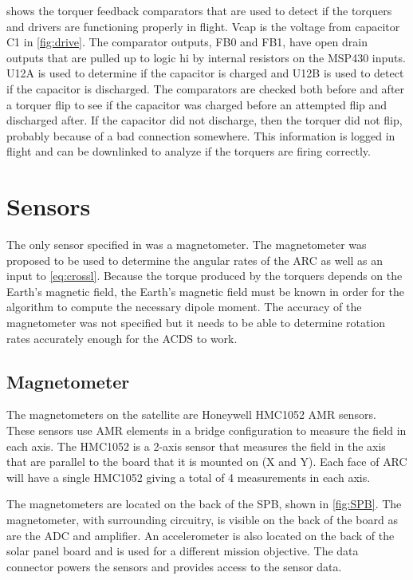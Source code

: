 shows the torquer feedback comparators that are used to detect if the torquers and drivers are functioning properly in flight. Vcap is the voltage from capacitor C1 in \cref{fig:drive}. The comparator outputs, FB0 and FB1, have open drain outputs that are pulled up to logic hi by internal resistors on the MSP430 inputs. U12A  is used to determine if the capacitor is charged and U12B is used to detect if the capacitor is discharged. The comparators are checked both before and after a torquer flip to see if the capacitor was charged before an attempted flip and discharged after. If the capacitor did not discharge, then the torquer did not flip, probably because of a bad connection somewhere. This information is logged in flight and can be downlinked to analyze if the torquers are firing correctly.

\section{Sensors}

The only sensor specified in \cite{Mentch11} was a magnetometer. The magnetometer was proposed to be used to determine the angular rates of the \ac{ARC} as well as an input to \cref{eq:crossl}. Because the torque produced by the torquers depends on the Earth's magnetic field, the Earth's magnetic field must be known in order for the algorithm to compute the necessary dipole moment. The accuracy of the magnetometer was not specified but it needs to be able to determine rotation rates accurately enough for the \ac{ACDS} to work.

\subsection{Magnetometer}

The magnetometers on the satellite are Honeywell HMC1052 \ac{AMR} sensors. These sensors use \ac{AMR} elements in a bridge configuration to measure the field in each axis. The HMC1052 is a 2-axis sensor that measures the field in the axis that are parallel to the board that it is mounted on (X and Y). Each face of \ac{ARC} will have a single HMC1052 giving a total of 4 measurements in each axis.

The magnetometers are located on the back of the \acs{SPB}, shown in \cref{fig:SPB}. The magnetometer, with surrounding circuitry, is visible on the back of the board as are the \ac{ADC} and amplifier. An accelerometer is also located on the back of the solar panel board and is used for a different mission objective. The data connector powers the sensors and provides access to the sensor data.

